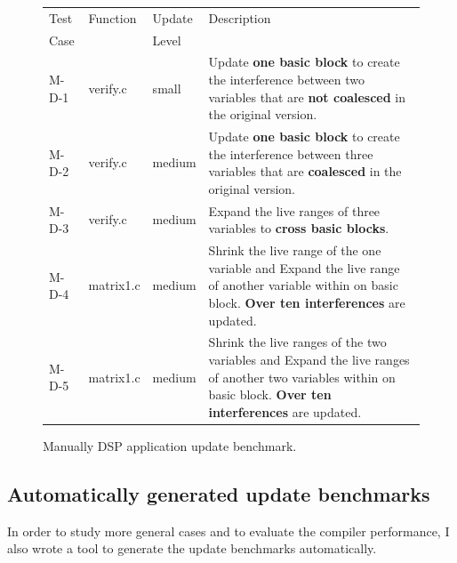 \begin{figure}[htdp]
\begin{small}

\begin{center}
\begin{tabular}{||p{0.5in}|p{0.6in}|p{1.2in}|p{3.5in}||}
\hline
Test &   Function & Update &Description \\
Case & & Level&\\
\hline\hline
M-D-1  & verify.c&small& Update \textbf{one basic block}  to create
the interference between two variables that are \textbf{not coalesced} 
in the original version.\\
\hline
M-D-2  & verify.c& medium & Update \textbf{one basic block} to create
the interference between three variables that are \textbf{coalesced}
in the original version. \\
\hline
M-D-3  & verify.c& medium & Expand the live ranges of three variables to
\textbf{cross basic blocks}. \\
\hline
M-D-4   & matrix1.c& medium & Shrink the live range of the one variable and
Expand the live range of another variable within on basic block.  \textbf{ Over
ten interferences} are updated.\\
\hline
M-D-5 & matrix1.c& medium  & Shrink the live ranges of the two variables and
Expand the live ranges of another two variables within on basic block.
 \textbf{Over ten interferences} are updated.\\
\hline
\end{tabular}
\end{center}
\caption{Manually DSP application update benchmark.}
\label{dsp-manual}
\end{small}
\vspace{-0.1in}
\end{figure}%

\subsection{Automatically generated update benchmarks}
In order to study more general cases and to evaluate the compiler performance,
I also wrote a tool to generate the update benchmarks automatically.

